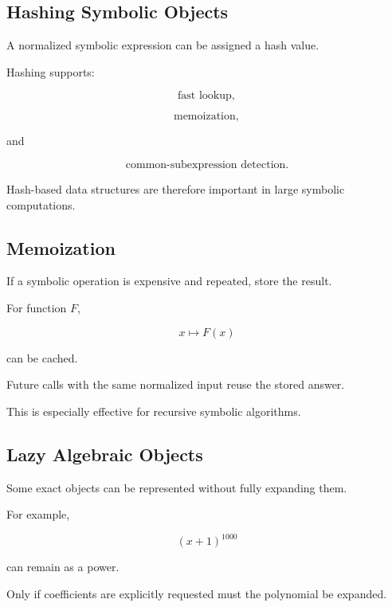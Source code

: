 \subsection{Hashing Symbolic Objects}
\label{subsec:hashing-symbolic-objects}

A normalized symbolic expression can be assigned a hash value.

Hashing supports:

\[
\boxed{
\text{fast lookup},
}
\]

\[
\boxed{
\text{memoization},
}
\]

and

\[
\boxed{
\text{common-subexpression detection}.
}
\]

Hash-based data structures are therefore important in large symbolic
computations.

\subsection{Memoization}
\label{subsec:computer-algebra-memoization}

If a symbolic operation is expensive and repeated, store the result.

For function \(F\),

\[
\boxed{
x
\mapsto
F(x)
}
\]

can be cached.

Future calls with the same normalized input reuse the stored answer.

This is especially effective for recursive symbolic algorithms.

\subsection{Lazy Algebraic Objects}
\label{subsec:lazy-algebraic-objects}

Some exact objects can be represented without fully expanding them.

For example,

\[
\boxed{
(x+1)^{1000}
}
\]

can remain as a power.

Only if coefficients are explicitly requested must the polynomial be
expanded.

